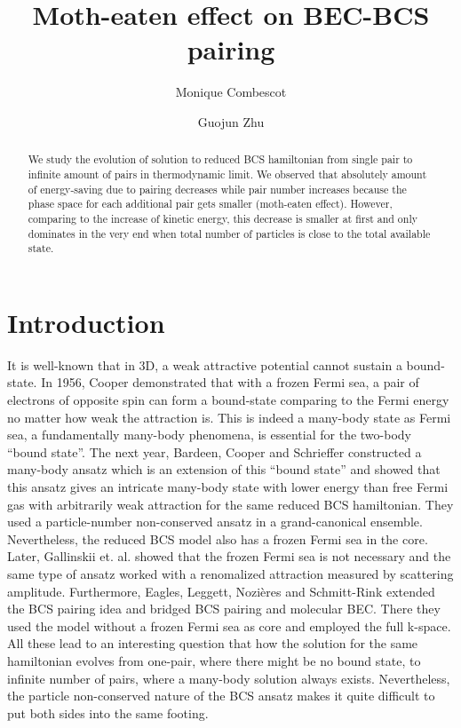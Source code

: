 \documentclass{article}
\author{Monique Combescot \and Guojun Zhu}
\title{Moth-eaten effect on BEC-BCS pairing}
\begin{document}
\maketitle
{}
\begin{abstract}
We study the evolution of solution to reduced BCS hamiltonian from single pair to infinite amount of pairs in thermodynamic limit.  We observed that absolutely amount of energy-saving due to pairing decreases while pair number increases because the phase space for each additional pair gets smaller (moth-eaten effect).  However, comparing to the increase of kinetic energy, this decrease is smaller at first and only dominates in the very end when total number of particles is close to the total available state.  
\end{abstract}
\section{Introduction}
It is well-known that in 3D, a weak attractive potential cannot sustain a bound-state.  In 1956, Cooper demonstrated that with a frozen Fermi sea, a pair of electrons of opposite spin can form a bound-state comparing to the Fermi energy no matter how weak the attraction is\cite{Cooper}.  This is indeed a many-body state as Fermi sea, a fundamentally many-body phenomena,  is essential for the two-body ``bound state''.   The next year, Bardeen, Cooper and Schrieffer constructed a many-body ansatz which is an extension of this ``bound state'' and showed that this ansatz gives an intricate many-body state with lower energy than free Fermi gas with arbitrarily weak attraction\cite{BCS} for the same reduced BCS hamiltonian.  They used a particle-number non-conserved ansatz in a grand-canonical ensemble.  Nevertheless, the reduced BCS model also has a frozen Fermi sea in the core. Later,   Gallinskii et. al. showed that the frozen Fermi sea is not necessary and the same type of ansatz worked with a renomalized attraction measured by scattering amplitude\cite{?}.   Furthermore, Eagles\cite{Eagle}, Leggett\cite{LeggettCrossover}, Nozi\`{e}res and Schmitt-Rink\cite{Nozieres} extended the BCS pairing idea and bridged BCS pairing and molecular BEC. There they used the model without a frozen Fermi sea as core and employed the full k-space.  All these lead to an interesting question that how the solution for the same hamiltonian evolves from one-pair, where there might be no bound state, to infinite number of pairs, where a many-body solution always exists.  Nevertheless, the particle non-conserved nature of the BCS ansatz makes it quite difficult to put both sides into the same footing.  
\end{document}
